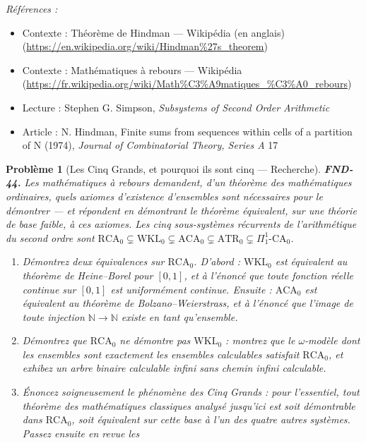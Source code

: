 \documentclass[11pt]{article}
\newtheorem{problem}{Problème}
\newenvironment{refs}{\par\small\noindent\emph{Références :}\begin{itemize}\setlength\itemsep{0pt}}{\end{itemize}\normalsize}
\begin{document}
\begin{refs}
\item Contexte : Théorème de Hindman --- Wikipédia (en anglais) (\url{https://en.wikipedia.org/wiki/Hindman%27s_theorem})
\item Contexte : Mathématiques à rebours --- Wikipédia (\url{https://fr.wikipedia.org/wiki/Math%C3%A9matiques_%C3%A0_rebours})
\item Lecture : Stephen G. Simpson, \textit{Subsystems of Second Order Arithmetic}
\item Article : N. Hindman, \og{} Finite sums from sequences within cells of a partition of N \fg{} (1974), \textit{Journal of Combinatorial Theory, Series A} 17
\end{refs}

\bigskip

\begin{problem}[{Les Cinq Grands, et pourquoi ils sont cinq --- Recherche}]
\textbf{FND-44.} Les mathématiques à rebours demandent, d'un théorème des mathématiques
ordinaires, quels axiomes d'existence d'ensembles sont nécessaires pour le démontrer --- et
répondent en démontrant le théorème équivalent, sur une théorie de base faible, à ces axiomes. Les
cinq sous-systèmes récurrents de l'arithmétique du second ordre sont
$ \mathrm{RCA}_0 \subsetneq \mathrm{WKL}_0 \subsetneq \mathrm{ACA}_0 \subsetneq \mathrm{ATR}_0
\subsetneq \Pi^1_1\text{-}\mathrm{CA}_0 $.
\begin{enumerate}
\item[(a)] Démontrez deux équivalences sur $ \mathrm{RCA}_0 $. D'abord : $ \mathrm{WKL}_0 $ est
équivalent au théorème de Heine--Borel pour $ [0,1] $, et à l'énoncé que toute fonction réelle
continue sur $ [0,1] $ est uniformément continue. Ensuite : $ \mathrm{ACA}_0 $ est équivalent
au théorème de Bolzano--Weierstrass, et à l'énoncé que l'image de toute injection
$ \mathbb{N} \to \mathbb{N} $ existe en tant qu'ensemble.
\item[(b)] Démontrez que $ \mathrm{RCA}_0 $ ne démontre pas $ \mathrm{WKL}_0 $ : montrez que le
$ \omega $-modèle dont les ensembles sont exactement les ensembles calculables satisfait
$ \mathrm{RCA}_0 $, et exhibez un arbre binaire calculable infini sans chemin infini
calculable.
\item[(c)] Énoncez soigneusement le \og{} phénomène des Cinq Grands \fg{} : pour l'essentiel, tout théorème des
mathématiques classiques analysé jusqu'ici est soit démontrable dans $ \mathrm{RCA}_0 $, soit
équivalent sur cette base à l'un des quatre autres systèmes. Passez ensuite en revue les

\end{enumerate}
\end{problem}
\end{document}
